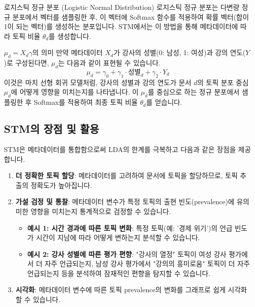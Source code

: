 \documentclass[11pt,a4paper]{article}
\begin{document}
\begin{definitionbox}{로지스틱 정규 분포 (Logistic Normal Distribution)}
로지스틱 정규 분포는 다변량 정규 분포에서 벡터를 샘플링한 후, 이 벡터에 Softmax 함수를 적용하여 확률 벡터(합이 1이 되는 벡터)를 생성하는 분포입니다. STM에서는 이 방법을 통해 메타데이터에 따라 토픽 비율 $\theta_d$를 생성합니다.
\end{definitionbox}

\begin{examplebox}{$\mu_d = X_d \gamma$의 의미}
만약 메타데이터 $X_d$가 강사의 성별(0: 남성, 1: 여성)과 강의 연도($Y$)로 구성된다면, $\mu_d$는 다음과 같이 표현될 수 있습니다.
\begin{equation*}
\mu_d = \gamma_0 + \gamma_1 \cdot \text{성별}_d + \gamma_2 \cdot Y_d
\end{equation*}
이것은 마치 선형 회귀 모델처럼, 강사의 성별과 강의 연도가 문서 $d$의 토픽 분포 중심 $\mu_d$에 어떻게 영향을 미치는지를 나타냅니다. 이 $\mu_d$를 중심으로 하는 정규 분포에서 샘플링한 후 Softmax를 적용하여 최종 토픽 비율 $\theta_d$를 얻습니다.
\end{examplebox}

\subsection{STM의 장점 및 활용}
STM은 메타데이터를 통합함으로써 LDA의 한계를 극복하고 다음과 같은 장점을 제공합니다.

\begin{enumerate}
    \item \textbf{더 정확한 토픽 할당}: 메타데이터를 고려하여 문서에 토픽을 할당하므로, 토픽 추출의 정확도가 높아집니다.
    \item \textbf{가설 검정 및 통찰}: 메타데이터 변수가 특정 토픽의 출현 빈도(prevalence)에 유의미한 영향을 미치는지 통계적으로 검정할 수 있습니다.
    \begin{itemize}
        \item \textbf{예시 1: 시간 경과에 따른 토픽 변화}: 특정 토픽(예: '경제 위기')의 언급 빈도가 시간이 지남에 따라 어떻게 변하는지 분석할 수 있습니다.
        \item \textbf{예시 2: 강사 성별에 따른 평가 편향}: "강사의 열정" 토픽이 여성 강사 평가에서 더 자주 언급되는지, 남성 강사 평가에서 "강의의 흥미로움" 토픽이 더 자주 언급되는지 등을 분석하여 잠재적인 편향을 탐지할 수 있습니다.
    \end{itemize}
    \item \textbf{시각화}: 메타데이터 변수에 따른 토픽 prevalence의 변화를 그래프로 쉽게 시각화할 수 있습니다.
\end{enumerate}
\end{document}

